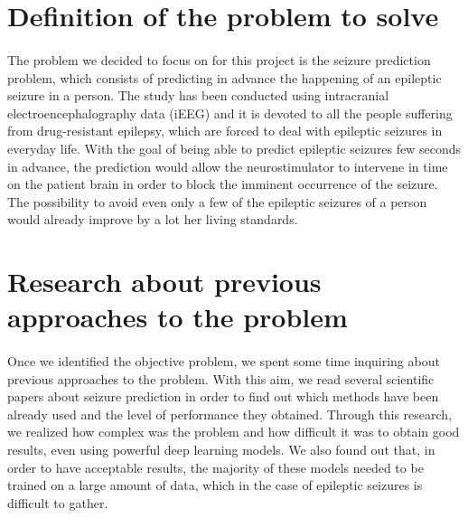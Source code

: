 
\section{Definition of the problem to solve} \label{sec: definition_problem_to_solve}
\paragraph{} The problem we decided to focus on for this project is the seizure prediction problem, which consists of predicting in advance the happening of an epileptic seizure in a person. The study has been conducted using intracranial electroencephalography data (iEEG) and it is devoted to all the people suffering from drug-resistant epilepsy, which are forced to deal with epileptic seizures in everyday life. With the goal of being able to predict epileptic seizures few seconds in advance, the prediction would allow the neurostimulator to intervene in time on the patient brain in order to block the imminent occurrence of the seizure. The possibility to avoid even only a few of the epileptic seizures of a person would already improve by a lot her living standards.


\section{Research about previous approaches to the problem} \label{sec: research_about_previous_approaches}
\paragraph{} Once we identified the objective problem, we spent some time inquiring about previous approaches to the problem. With this aim, we read several scientific papers about seizure prediction in order to find out which methods have been already used and the level of performance they obtained. Through this research, we realized how complex was the problem and how difficult it was to obtain good results, even using powerful deep learning models. We also found out that, in order to have acceptable results, the majority of these models needed to be trained on a large amount of data, which in the case of epileptic seizures is difficult to gather.

